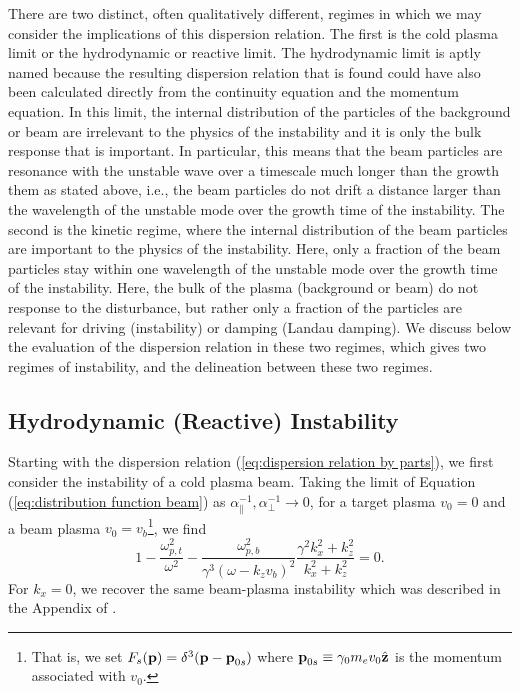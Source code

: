 \documentclass[usenatbib,iop,apj,numberedappendix]{aeb_emulateapj_2010}
\newcommand\bmath[1] {\mbox{\boldmath$\rm #1$}}
\begin{document}
There are two distinct, often qualitatively different, regimes in which we may consider the implications of this dispersion relation.  The first is the cold plasma limit or the hydrodynamic or reactive limit.  The hydrodynamic limit is aptly named because the resulting dispersion relation that is found could have also been calculated directly from the continuity equation and the momentum equation.  In this limit, the internal distribution of the particles of the background or beam are irrelevant to the physics of the instability and it is only the bulk response that is important.  In particular, this means that the beam particles are resonance with the unstable wave over a timescale much longer than the growth them as stated above, i.e., the beam particles do not drift a distance larger than the wavelength of the unstable mode over the growth time of the instability.  The second is the kinetic regime, where the internal distribution of the beam particles are important to the physics of the instability. Here, only a fraction of the beam particles stay within one wavelength of the unstable mode over the growth time of the instability.   Here, the bulk of the plasma (background or beam) do not response to the disturbance, but rather only a fraction of the particles are relevant for driving (instability) or damping (Landau damping).  We discuss below the evaluation of the dispersion relation in these two regimes, which gives two regimes of instability, and the delineation between these two regimes.

\subsection{Hydrodynamic (Reactive) Instability}

Starting with the dispersion relation (\ref{eq:dispersion relation by parts}), we first consider the instability of a cold plasma beam. 
Taking the limit of Equation (\ref{eq:distribution function beam}) as $\alpha_{\parallel}^{-1}, \alpha_{\perp}^{-1} \rightarrow 0$, for a target plasma $v_0=0$ and a beam plasma $v_0=v_b$\footnote{That is, we set $F_s(\bmath{p})=\delta^3(\bmath{p}-\bmath{p}_{0s})$ where $\bmath{p}_{0s}\equiv \gamma_0 m_e v_0 \hat{\bmath{z}}$ is the momentum associated with $v_0$.}, we find
\begin{equation}\label{eq:dispersion relation reactive}
 1 - \frac{\omega_{p,t}^2}{\omega^2} - \frac{\omega_{p,b}^2}{\gamma^3(\omega-k_z v_b)^2}\frac{\gamma^2 k_x^2 + k_z^2}{k_x^2 + k_z^2} = 0.
\end{equation}
For $k_x = 0$, we recover the same beam-plasma instability which was described in the Appendix of \citet{BCP}.  
\end{document}
